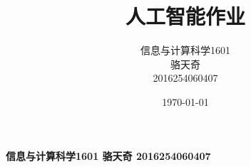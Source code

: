 \documentclass{article}
\title{人工智能作业}
\author{信息与计算科学1601\\ 骆天奇\\ 2016254060407}
\date{\today}
\begin{document}
	\paragraph{信息与计算科学1601 骆天奇 2016254060407}
	
%	
\end{document}
